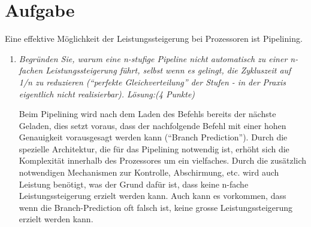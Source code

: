 \documentclass[10pt]{article}
\begin{document}
\section{Aufgabe}
Eine effektive Möglichkeit der Leistungssteigerung bei Prozessoren ist Pipelining.
\begin{enumerate}[label=\alph*)]
	\item 
	\textit{Begründen 	Sie, warum eine n-stufige Pipeline nicht automatisch zu einer n-fachen Leistungssteigerung führt, selbst wenn es gelingt, die Zykluszeit auf 1/n zu reduzieren ("`perfekte Gleichverteilung"' der Stufen - in der Praxis eigentlich nicht realisierbar). Lösung:(4 Punkte)}
	
	Beim Pipelining wird nach dem Laden des Befehls bereits der nächste Geladen, dies setzt voraus, dass der nachfolgende Befehl mit einer hohen Genauigkeit vorausgesagt werden kann ("`Branch Prediction"'). Durch die spezielle Architektur, die für das Pipelining notwendig ist, erhöht sich die Komplexität innerhalb des Prozessores um ein vielfaches. Durch die zusätzlich notwendigen Mechanismen zur Kontrolle, Abschirmung, etc. wird auch Leistung benötigt, was der Grund dafür ist, dass keine n-fache Leistungssteigerung erzielt werden kann. Auch kann es vorkommen, dass wenn die Branch-Prediction oft falsch ist, keine grosse Leistungssteigerung erzielt werden kann.
\end{enumerate}
\newpage

\end{document}
